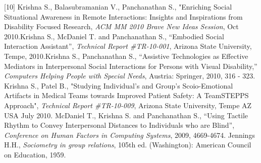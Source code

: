 \documentclass{article} %
\begin{document}
{[10] Krishna S., Balasubramanian V., Panchanathan S., "Enriching Social Situational Awareness in Remote Interactions: Insights and Inspirations from Disability Focused Research, {\it ACM MM 2010 Brave New Ideas Session}, Oct 2010.\newline
[11] Krishna S., McDaniel T. and Panchanathan S., “Embodied Social Interaction Assistant”, {\it Technical Report \#TR-10-001}, Arizona State University, Tempe, 2010.\newline
[12] Krishna S., Panchanathan S., “Assistive Technologies as Effective Mediators in Interpersonal Social Interactions for Persons with Visual Disability,” {\it Computers Helping People with Special Needs}, Austria: Springer, 2010, 316 - 323. \newline
[13] Krishna S., Patel B., "Studying Individual’s and Group’s Scoio-Emotional Artifacts in Medical Teams towards Improved Patient Safety: A TeamSTEPPS Approach", {\it Technical Report \#TR-10-009}, Arizona State University, Tempe AZ USA July 2010. \newline
[14] McDaniel T., Krishna S. and Panchanathan S., “Using Tactile Rhythm to Convey Interpersonal Distances to Individuals who are Blind”, {\it Conference on Human Factors in Computing Systems}, 2009, 4669-4674. \newline
[15] Jennings H.H., {\it Sociometry in group relations}, 105th ed. (Washington): American Council on Education, 1959.

}
\end{document}
